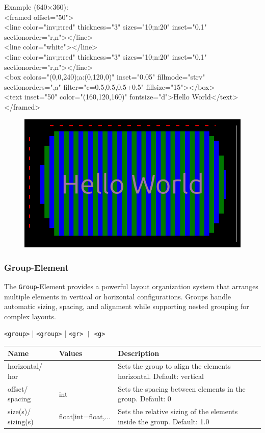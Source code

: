 \documentclass[a4paper,11pt]{article}
\begin{document}
Example (640×360):\\
<framed offset="50">\\
  <line color="inv;r:red" thickness="3" sizes="10;n:20" inset="0.1" sectionorder="r,n"></line>\\
  <line color="white"></line>\\
  <line color="inv;r:red" thickness="3" sizes="10;n:20" inset="0.1" sectionorder="r,n"></line>\\
  <box colors="(0,0,240);a:(0,120,0)" inset="0.05" fillmode="strv" sectionorders=",a" filter="c=0.5,0.5,0.5+0.5" fillsize="15"></box>\\
  <text inset="50" color="(160,120,160)" fontsize="d">Hello World</text>\\
</framed>
\begin{figure}[h]
    \centering
    \includegraphics[width=0.5\linewidth]{images/framed.png}
\end{figure}



\newpage
\hypertarget{group}{}
\subsubsection*{Group-Element}
The \texttt{Group}-Element provides a powerful layout organization system that arranges multiple elements in vertical or horizontal configurations. Groups handle automatic sizing, spacing, and alignment while supporting nested grouping for complex layouts.
\begin{center}
    \texttt{<group>} | \texttt{<group>} | \texttt{<gr> | \texttt{<g>}}
\end{center}

\renewcommand{\arraystretch}{1.3}
\begin{tcolorbox}[colback=white, colframe=black!75, title=Arguments]
\begin{tabularx}{\linewidth}{p{50pt}|p{110pt}|X}
\textbf{Name} & \textbf{Values} & \textbf{Description}\\
\hline
horizontal/ hor & & Sets the group to align the elements horizontal. Default: vertical\\
\rowcolor[HTML]{E8E8E8}
offset/ spacing & int & Sets the spacing between elements in the group. Default: 0\\
size(s)/ sizing(s) & float|int=float,... & Sets the relative sizing of the elements inside the group. Default: 1.0\\
\end{tabularx}
\end{tcolorbox}
\end{document}
